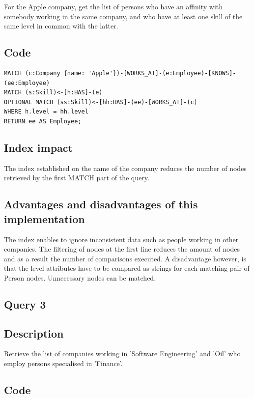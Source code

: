 \documentclass[a4paper, 11pt, titlepage]{article}
\begin{document}
\noindent
For the Apple company, get the list of persons who have an affinity with somebody working in the same company, and who have at least one skill of the same level in common with the latter.


\subsection* {Code}

\begin{verbatim}
MATCH (c:Company {name: 'Apple'})-[WORKS_AT]-(e:Employee)-[KNOWS]-(ee:Employee)
MATCH (s:Skill)<-[h:HAS]-(e)
OPTIONAL MATCH (ss:Skill)<-[hh:HAS]-(ee)-[WORKS_AT]-(c)
WHERE h.level = hh.level
RETURN ee AS Employee;
\end{verbatim}


\subsection* {Index impact}

\noindent
The index established on the name of the company reduces the number of nodes retrieved by the first MATCH part of the query.



\subsection* {Advantages and disadvantages of this implementation}

\noindent
The index enables to ignore inconsistent data such as people working in other companies. The filtering of nodes at the first line reduces the amount of nodes and as a result the number of comparisons executed.
A disadvantage however, is that the level attributes have to be compared as strings for each matching pair of Person nodes. Unnecessary nodes can be matched.


\subsection {Query 3}

\subsection* {Description}

\noindent
Retrieve the list of companies working in 'Software Engineering' and 'Oil' who employ persons specialised in 'Finance'.


\subsection* {Code}
\end{document}
